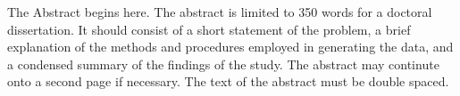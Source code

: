 \documentclass[12pt]{ucsddissertation}
\theoremstyle{plain}%
\theoremstyle{definition}
\begin{document}

\begin{dissertationabstract}
The Abstract begins here. The abstract is limited to 350 words for a
doctoral dissertation. It should consist of a short statement of the
problem, a brief explanation of the methods and procedures employed in
generating the data, and a condensed summary of the findings of the
study. The abstract may continute onto a second page if necessary. The
text of the abstract must be double spaced.
\end{dissertationabstract}
\end{document}
